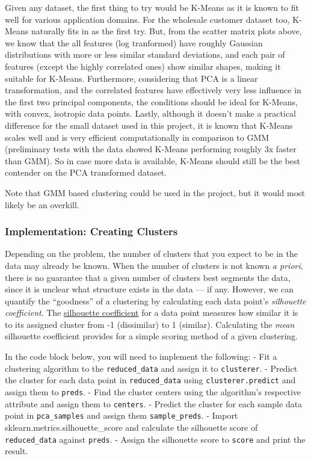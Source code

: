 \documentclass{article}
\begin{document}
Given any dataset, the first thing to try would be K-Means as it is
known to fit well for various application domains. For the wholesale
customer dataset too, K-Means naturally fits in as the first try. But,
from the scatter matrix plots above, we know that the all features (log
tranformed) have roughly Gaussian distributions with more or less
similar standard deviations, and each pair of features (except the
highly correlated ones) show similar shapes, making it suitable for
K-Means. Furthermore, considering that PCA is a linear transformation,
and the correlated features have effectively very less influence in the
first two principal components, the conditions should be ideal for
K-Means, with convex, isotropic data points. Lastly, although it doesn't
make a practical difference for the small dataset used in this project,
it is known that K-Means scales well and is very efficient
computationally in comparison to GMM (preliminary tests with the data
showed K-Means performing roughly 3x faster than GMM). So in case more
data is available, K-Means should still be the best contender on the PCA
transformed dataset.

Note that GMM based clustering could be used in the project, but it
would most likely be an overkill.

    \subsubsection{Implementation: Creating
Clusters}\label{implementation-creating-clusters}

Depending on the problem, the number of clusters that you expect to be
in the data may already be known. When the number of clusters is not
known \emph{a priori}, there is no guarantee that a given number of
clusters best segments the data, since it is unclear what structure
exists in the data --- if any. However, we can quantify the ``goodness''
of a clustering by calculating each data point's \emph{silhouette
coefficient}. The
\href{http://scikit-learn.org/stable/modules/generated/sklearn.metrics.silhouette_score.html}{silhouette
coefficient} for a data point measures how similar it is to its assigned
cluster from -1 (dissimilar) to 1 (similar). Calculating the \emph{mean}
silhouette coefficient provides for a simple scoring method of a given
clustering.

In the code block below, you will need to implement the following: - Fit
a clustering algorithm to the \texttt{reduced\_data} and assign it to
\texttt{clusterer}. - Predict the cluster for each data point in
\texttt{reduced\_data} using \texttt{clusterer.predict} and assign them
to \texttt{preds}. - Find the cluster centers using the algorithm's
respective attribute and assign them to \texttt{centers}. - Predict the
cluster for each sample data point in \texttt{pca\_samples} and assign
them \texttt{sample\_preds}. - Import sklearn.metrics.silhouette\_score
and calculate the silhouette score of \texttt{reduced\_data} against
\texttt{preds}. - Assign the silhouette score to \texttt{score} and
print the result.
\end{document}

